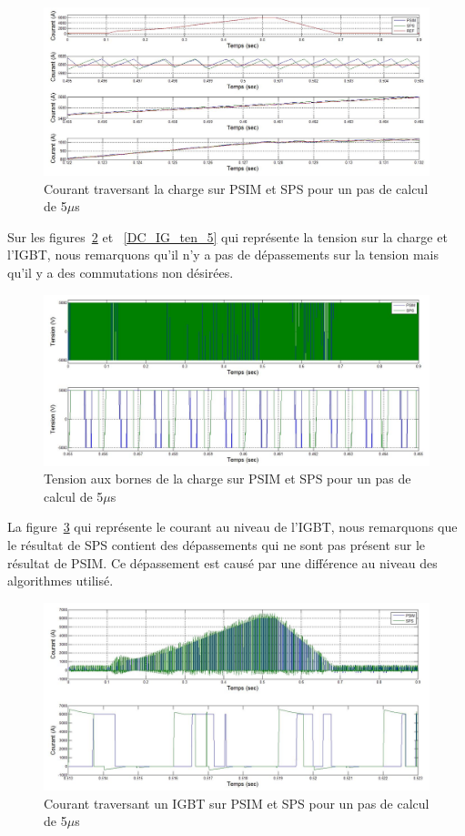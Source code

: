 \documentclass[11pt,letterpaper,final]{report}
\begin{document}
\begin{figure}[htb]
\centering
\includegraphics[scale=0.5]{Fig/DCPDCN/DCPCourantCharge5u.jpg}
\caption{Courant traversant la charge sur PSIM et SPS pour un pas de calcul de 5$\mu$s}
\label{DC_ch_cou_5}
\end{figure}
Sur les figures~\ref{DC_ch_ten_5} et ~\ref{DC_IG_ten_5} qui représente la tension sur la charge et l'IGBT, nous remarquons qu'il n'y a pas de dépassements sur la tension  mais qu'il y a des commutations non désirées. 

\begin{figure}[htb]
\centering
\includegraphics[scale=0.5]{Fig/DCPDCN/DCPTensionCharge5u.jpg}
\caption{Tension aux bornes de la charge sur PSIM et SPS pour un pas de calcul de 5$\mu$s}
\label{DC_ch_ten_5}
\end{figure}

La figure~\ref{DC_IG_cou_5} qui représente le courant au niveau de l'IGBT, nous remarquons que le résultat de SPS contient des dépassements qui ne sont pas présent sur le résultat de PSIM. Ce dépassement est causé par une différence au niveau des algorithmes utilisé.

\begin{figure}[htb]
\centering
\includegraphics[scale=0.5]{Fig/DCPDCN/DCPCourantIGBT5u.jpg}
\caption{Courant traversant un IGBT sur PSIM et SPS pour un pas de calcul de 5$\mu$s}
\label{DC_IG_cou_5}
\end{figure}
\end{document}
